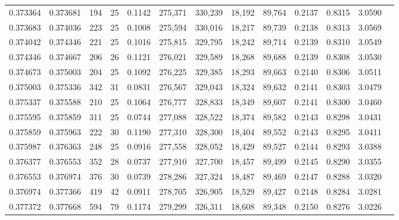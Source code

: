 \begin{tabular}{rrrrrrrrrrrrr}
0.373364 & 0.373681 &   194 &  25 &                                     0.1142 & 275,371 & 330,239 &  18,192 &  89,764 & 0.2137 & 0.8315 & 3.0590 \\
0.373683 & 0.374036 &   223 &  25 &                                     0.1008 & 275,594 & 330,016 &  18,217 &  89,739 & 0.2138 & 0.8313 & 3.0569 \\
0.374042 & 0.374346 &   221 &  25 &                                     0.1016 & 275,815 & 329,795 &  18,242 &  89,714 & 0.2139 & 0.8310 & 3.0549 \\
0.374346 & 0.374667 &   206 &  26 &                                     0.1121 & 276,021 & 329,589 &  18,268 &  89,688 & 0.2139 & 0.8308 & 3.0530 \\
0.374673 & 0.375003 &   204 &  25 &                                     0.1092 & 276,225 & 329,385 &  18,293 &  89,663 & 0.2140 & 0.8306 & 3.0511 \\
0.375003 & 0.375336 &   342 &  31 &                                     0.0831 & 276,567 & 329,043 &  18,324 &  89,632 & 0.2141 & 0.8303 & 3.0479 \\
0.375337 & 0.375588 &   210 &  25 &                                     0.1064 & 276,777 & 328,833 &  18,349 &  89,607 & 0.2141 & 0.8300 & 3.0460 \\
0.375595 & 0.375859 &   311 &  25 &                                     0.0744 & 277,088 & 328,522 &  18,374 &  89,582 & 0.2143 & 0.8298 & 3.0431 \\
0.375859 & 0.375963 &   222 &  30 &                                     0.1190 & 277,310 & 328,300 &  18,404 &  89,552 & 0.2143 & 0.8295 & 3.0411 \\
0.375987 & 0.376363 &   248 &  25 &                                     0.0916 & 277,558 & 328,052 &  18,429 &  89,527 & 0.2144 & 0.8293 & 3.0388 \\
0.376377 & 0.376553 &   352 &  28 &                                     0.0737 & 277,910 & 327,700 &  18,457 &  89,499 & 0.2145 & 0.8290 & 3.0355 \\
0.376553 & 0.376974 &   376 &  30 &                                     0.0739 & 278,286 & 327,324 &  18,487 &  89,469 & 0.2147 & 0.8288 & 3.0320 \\
0.376974 & 0.377366 &   419 &  42 &                                     0.0911 & 278,705 & 326,905 &  18,529 &  89,427 & 0.2148 & 0.8284 & 3.0281 \\
0.377372 & 0.377668 &   594 &  79 &                                     0.1174 & 279,299 & 326,311 &  18,608 &  89,348 & 0.2150 & 0.8276 & 3.0226 \\

\end{tabular}
